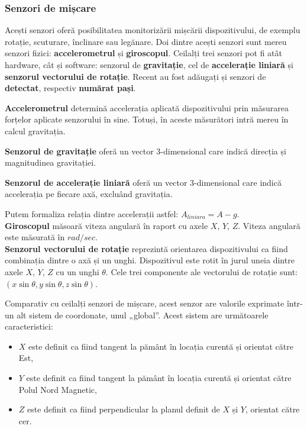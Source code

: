 \documentclass[12pt,a4paper]{article}
\begin{document}
\subsubsection{Senzori de mișcare}
Acești senzori oferă posibilitatea monitorizării mișcării dispozitivului, de exemplu rotație, scuturare, înclinare sau legănare. Doi dintre acești senzori sunt mereu senzori fizici: \textbf{accelerometrul} și \textbf{giroscopul}. Ceilalți trei senzori pot fi atât hardware, cât și software: senzorul de \textbf{gravitație}, cel de \textbf{accelerație liniară} și \textbf{senzorul vectorului de rotație}. Recent au fost adăugați și senzori de \textbf{detectat}, respectiv \textbf{numărat pași}.

	\textbf{Accelerometrul} determină accelerația aplicată dispozitivului prin măsurarea forțelor aplicate senzorului în sine. Totuși, în aceste măsurători intră mereu în calcul gravitația.

	\textbf{Senzorul de gravitație} oferă un vector 3-dimensional care indică direcția și magnitudinea gravitației.

	\textbf{Senzorul de accelerație liniară} oferă un vector 3-dimensional care indică accelerația pe fiecare axă, excluând gravitația.

	Putem formaliza relația dintre accelerații astfel:
	$A_{liniara} = A - g$.\\

	\textbf{Giroscopul} măsoară viteza angulară în raport cu axele $X$, $Y$, $Z$. Viteza angulară este măsurată în $rad/sec$.\\

	\textbf{Senzorul vectorului de rotație} reprezintă orientarea dispozitivului ca fiind combinația dintre o axă și un unghi. Dispozitivul este rotit în jurul uneia dintre axele $X$, $Y$, $Z$ cu un unghi $\theta$. Cele trei componente ale vectorului de rotație sunt: $(x \sin{\theta}, y \sin{\theta}, z \sin{\theta})$. 
	
	Comparativ cu ceilalți senzori de mișcare, acest senzor are valorile exprimate într-un alt sistem de coordonate, unul „global”.
	Acest sistem are următoarele caracteristici:
	\begin{itemize}
	\item $X$ este definit ca fiind tangent la pământ în locația curentă și orientat către Est,
	\item $Y$ este definit ca fiind tangent la pământ în locația curentă și orientat către Polul Nord Magnetic,
	\item $Z$ este definit ca fiind perpendicular la planul definit de $X$ și $Y$, orientat către cer.
	\end{itemize}
	
\end{document}
